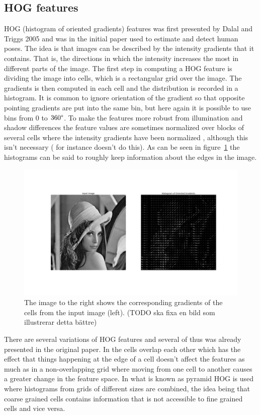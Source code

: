 \documentclass[a4paper,11pt]{kth-mag}
\begin{document}
\subsection{HOG features}
HOG (histogram of oriented gradients) features was first presented by Dalal and Triggs 2005 and was in the initial paper used to estimate and detect human poses\cite{HOG}.
The idea is that images can be described by the intensity gradients that it contains.
That is, the directions in which the intensity increases the most in different parts of the image.
The first step in computing a HOG feature is dividing the image into cells, which is a rectangular grid over the image.
The gradients is then computed in each cell and the distribution is recorded in a histogram.
It is common to ignore orientation of the gradient so that opposite pointing gradients are put into the same bin, but here again it is possible to use bins from 0 to $360\degree$.
To make the features more robust from illumination and shadow differences the feature values are sometimes normalized over blocks of several cells where the intensity gradients have been normalized \cite{HOG}, although this isn't necessary (\cite{exampleBased} for instance doesn't do this).
As can be seen in figure~\ref{fig:HOG_girl} the histograms can be said to roughly keep information about the edges in the image. 
\begin{figure}[!ht]
    \centering
    \includegraphics[width=\textwidth]{images/hog_lena_old.png}
    \caption{The image to the right shows the corresponding gradients of the cells from the input image (left). (TODO ska fixa en bild som illustrerar detta b\"{a}ttre)} 
    \label{fig:HOG_girl}
\end{figure}

There are several variations of HOG features and several of thus was already presented in the original paper\cite{HOG}.
In \cite{3Dhuman} the cells overlap each other which has the effect that things happening at the edge of a cell doesn't affect the features as much as in a non-overlapping grid where moving from one cell to another causes a greater change in the feature space.
In \cite{monocular} what is known as pyramid HOG is used where histograms from grids of different sizes are combined, the idea being that coarse grained cells contains information that is not accessible to fine grained cells and vice versa. 
\end{document}
